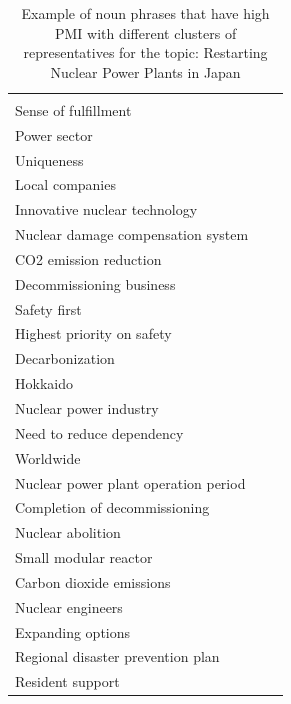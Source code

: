 \documentclass[final,5p,times,twocolumn,authoryear]{elsarticle}
\begin{document}
\begin{table}[htbp]
\begin{tabularx}{\textwidth}{|>{\centering\arraybackslash}X|>{\centering\arraybackslash}X|>{\centering\arraybackslash}X|}
\begin{tabular}[c]{@{}l@{}}
	Industrial policy \\ Sense of fulfillment \\ Power sector \\ Uniqueness \\ Local companies \\ Innovative nuclear technology \\ Nuclear damage compensation system \\ CO2 emission reduction \\ Decommissioning business \\ Safety first \\ Highest priority on safety \\ Decarbonization \\ Hokkaido \\ Nuclear power industry \\ Need to reduce dependency \\ Worldwide \\ Nuclear power plant operation period \\ Completion of decommissioning \\ Nuclear abolition \\ Small modular reactor \\ Carbon dioxide emissions \\ Nuclear engineers \\ Expanding options \\ Regional disaster prevention plan \\ Resident support
\end{tabular} \\ \hline
\end{tabularx}
\caption{Example of noun phrases that have high PMI with different clusters of representatives for the topic: Restarting Nuclear Power Plants in Japan}
\label{table:PMI-nuclear}
\end{table}
\end{document}
